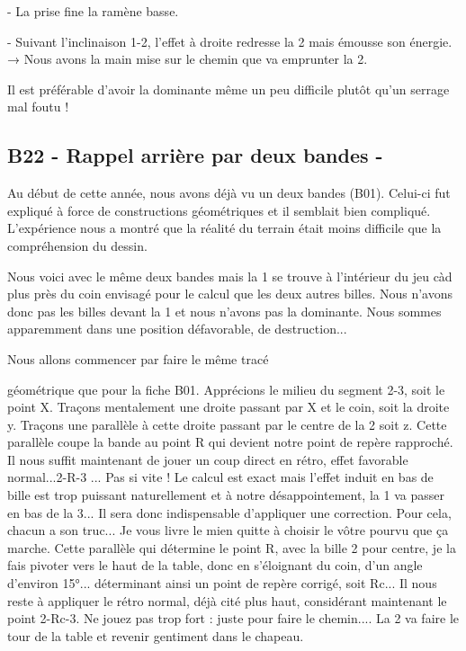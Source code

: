 - La prise fine la ramène basse.

- Suivant l'inclinaison 1-2, l'effet à droite redresse la 2 mais émousse
son énergie. → Nous avons la main mise sur le chemin que va emprunter la
2.

Il est préférable d'avoir la dominante même un peu difficile plutôt
qu'un serrage mal foutu !

\subsection{B22 - Rappel arrière par deux bandes -
}\label{b22---rappel-arriuxe8re-par-deux-bandes--}

Au début de cette année, nous avons déjà vu un deux bandes (B01).
Celui-ci fut expliqué à force de constructions géométriques et il
semblait bien compliqué. L'expérience nous a montré que la réalité du
terrain était moins difficile que la compréhension du dessin.

Nous voici avec le même deux bandes mais la 1 se trouve à l'intérieur du
jeu càd plus près du coin envisagé pour le calcul que les deux autres
billes. Nous n'avons donc pas les billes devant la 1 et nous n'avons pas
la dominante. Nous sommes apparemment dans une position défavorable, de
destruction...

Nous allons commencer par faire le même tracé

géométrique que pour la fiche B01. Apprécions le milieu du segment 2-3,
soit le point X. Traçons mentalement une droite passant par X et le
coin, soit la droite y. Traçons une parallèle à cette droite passant par
le centre de la 2 soit z. Cette parallèle coupe la bande au point R qui
devient notre point de repère rapproché. Il nous suffit maintenant de
jouer un coup direct en rétro, effet favorable normal...2-R-3 ... Pas si
vite ! Le calcul est exact mais l'effet induit en bas de bille est trop
puissant naturellement et à notre désappointement, la 1 va passer en bas
de la 3... Il sera donc indispensable d'appliquer une correction. Pour
cela, chacun a son truc... Je vous livre le mien quitte à choisir le
vôtre pourvu que ça marche. Cette parallèle qui détermine le point R,
avec la bille 2 pour centre, je la fais pivoter vers le haut de la
table, donc en s'éloignant du coin, d'un angle d'environ 15°...
déterminant ainsi un point de repère corrigé, soit Rc... Il nous reste à
appliquer le rétro normal, déjà cité plus haut, considérant maintenant
le point 2-Rc-3. Ne jouez pas trop fort : juste pour faire le chemin....
La 2 va faire le tour de la table et revenir gentiment dans le chapeau.

